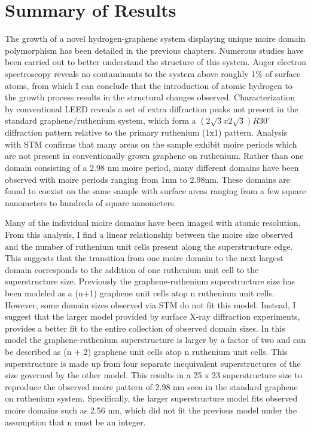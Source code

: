 \section{Summary of Results}
The growth of a novel hydrogen-graphene system displaying unique moire domain polymorphism has been detailed in the previous chapters. Numerous studies have been carried out to better understand the structure of this system. Auger electron spectroscopy reveals no contaminants to the system above roughly 1\% of surface atoms, from which I can conclude that the introduction of atomic hydrogen to the growth process results in the structural changes observed. Characterization by conventional LEED reveals a set of extra diffraction peaks not present in the standard graphene/ruthenium system, which form a $(2\sqrt{3} x 2\sqrt{3})R30^\circ$ diffraction pattern relative to the primary ruthenium (1x1) pattern. Analysis with STM confirms that many areas on the sample exhibit moire periods which are not present in conventionally grown graphene on ruthenium. Rather than one domain consisting of a 2.98 nm moire period, many different domains have been observed with moire periods ranging from 1nm to 2.98nm. These domains are found to coexist on the same sample with surface areas ranging from a few square nanometers to hundreds of square nanometers.

Many of the individual moire domains have been imaged with atomic resolution. From this analysis, I find a linear relationship between the moire size observed and the number of ruthenium unit cells present along the superstructure edge. This suggests that the transition from one moire domain to the next largest domain corresponds to the addition of one ruthenium unit cell to the superstructure size. Previously the graphene-ruthenium superstructure size has been modeled as a (n+1) graphene unit cells atop n ruthenium unit cells. However, some domain sizes observed via STM do not fit this model. Instead, I suggest that the larger model provided by surface X-ray diffraction experiments, provides a better fit to the entire collection of observed domain sizes. In this model the graphene-ruthenium superstructure is larger by a factor of two and can be described as (n + 2) graphene unit cells atop n ruthenium unit cells. This superstructure is made up from four separate inequivalent superstructures of the size governed by the other model. This results in a 25 x 23 superstructure size to reproduce the observed moire pattern of 2.98 nm seen in the standard graphene on ruthenium system. Specifically, the larger superstructure model fits observed moire domains such as 2.56 nm, which did not fit the previous model under the assumption that n must be an integer.


